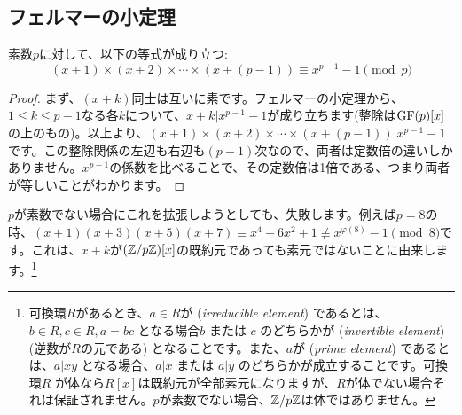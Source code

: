 \documentclass{jsarticle}
\begin{document}
  \subsection{フェルマーの小定理~}
  \begin{theorem}
   \label{thm:polynomial-fermat}
   素数$p$に対して、以下の等式が成り立つ:
   \begin{displaymath}
    (x+1) \times (x+2) \times \cdots \times (x + (p - 1)) \equiv x^{p-1} - 1 \pmod p
   \end{displaymath}
  \end{theorem}
  \begin{proof}
  まず、$(x+k)$同士は互いに素です。フェルマーの小定理から、$1 \le k \le p - 1$なる各$k$について、$x + k | x^{p-1} - 1$が成り立ちます(整除は$\mathrm{GF}(p)[x]$の上のもの)。以上より、$(x+1) \times (x+2) \times \cdots \times (x + (p - 1)) | x^{p-1}-1$です。この整除関係の左辺も右辺も$(p-1)$次なので、両者は定数倍の違いしかありません。$x^{p-1}$の係数を比べることで、その定数倍は1倍である、つまり両者が等しいことがわかります。
  \end{proof}
  \begin{remark}
   $p$が素数でない場合にこれを拡張しようとしても、失敗します。例えば$p=8$の時、$(x+1)(x+3)(x+5)(x+7) \equiv x^4 + 6x^2 + 1 \not \equiv x^{\varphi(8)}-1 \pmod 8$です。これは、$x+k$が$(\mathbb{Z}/p\mathbb{Z})[x]$の既約元であっても素元ではないことに由来します。\footnote{可換環$R$があるとき、$a \in R$が (\emph{irreducible element}) であるとは、$b\in R, c\in R, a = bc$ となる場合$b$ または $c$ のどちらかが (\emph{invertible element}) (逆数が$R$の元である) となることです。また、$a$が (\emph{prime element}) であるとは、$a | xy$ となる場合、$a | x$ または $a | y$ のどちらかが成立することです。可換環$R$ が体なら$R[x]$は既約元が全部素元になりますが、$R$が体でない場合それは保証されません。$p$が素数でない場合、$\mathbb{Z}/p\mathbb{Z}$は体ではありません。}
  \end{remark}
\end{document}
